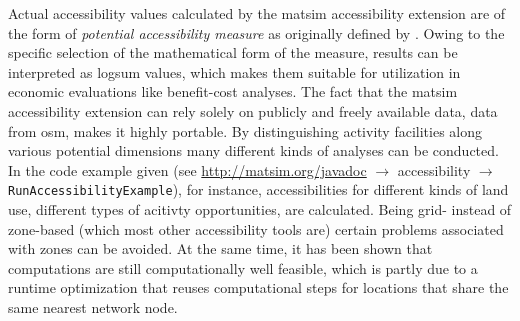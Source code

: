 Actual accessibility values calculated by the \gls{matsim} accessibility extension are of the form of 
\emph{potential accessibility measure} as originally defined by \citet{Hansen1959HowAccessibilityShapesLandUse}.
Owing to the specific selection of the mathematical form of the measure, results can be interpreted as 
\gls{logsum} values, which makes them suitable for utilization in economic evaluations like benefit-cost analyses.
The fact that the \gls{matsim} accessibility extension can rely solely on publicly and freely available 
data, \eg data from \gls{osm}, makes it highly portable. By distinguishing activity facilities 
along various potential dimensions many different kinds of analyses can be conducted. In the code example given
(see \url{http://matsim.org/javadoc} $\to$ accessibility $\to$ \lstinline{RunAccessibilityExample}), for instance,
accessibilities for different kinds of land use, \ie different types of acitivty opportunities, are calculated.
Being grid- instead of zone-based (which most other accessibility tools are) certain problems associated with 
zones can be avoided. At the same time, it has been shown that computations are still computationally well
feasible, which is partly due to a runtime optimization that reuses computational steps for locations that 
share the same nearest network node.






%
%




